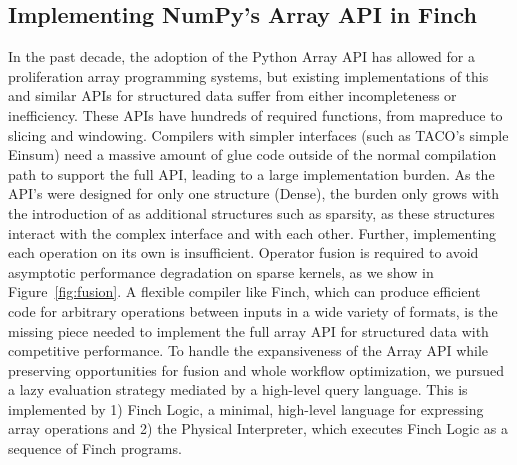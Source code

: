 \subsection{Implementing NumPy's Array API in Finch}
In the past decade, the adoption of the Python Array API \cite{harris_array_2020} has allowed for a proliferation array programming systems, but existing implementations of this and similar APIs for structured data suffer from either incompleteness or inefficiency.
%
These APIs have hundreds of required functions, from mapreduce to slicing and windowing. 
%
Compilers with simpler interfaces (such as TACO's simple Einsum) need a massive amount of glue code outside of the normal compilation path to support the full API, leading to a large implementation burden.
%
As the API's were designed for only one structure (Dense), the burden only grows with the introduction of as additional structures such as sparsity, as these structures interact with the complex interface and with each other.
%
%
Further, implementing each operation on its own is insufficient. Operator fusion is required to avoid asymptotic performance degradation on sparse kernels, as we show in Figure~\ref{fig:fusion}.
%
A flexible compiler like Finch, which can produce efficient code for arbitrary operations between inputs in a wide variety of formats, is the missing piece needed to implement the full array API for structured data with competitive performance.
%
To handle the expansiveness of the Array API while preserving opportunities for fusion and whole workflow optimization, we pursued a lazy evaluation strategy mediated by a high-level query language.
%
This is implemented by 1) Finch Logic, a minimal, high-level language for expressing array operations and 2) the Physical Interpreter, which executes Finch Logic as a sequence of Finch programs.




